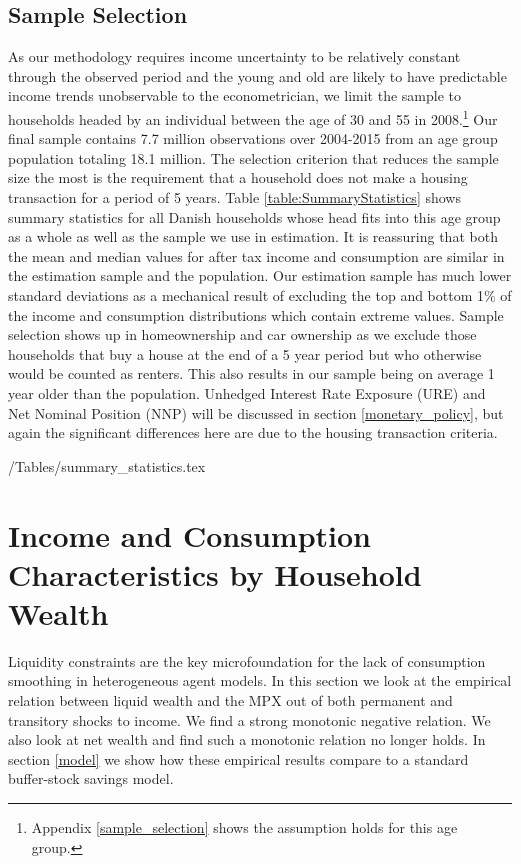 \documentclass[titlepage]{\econtex}\newcommand{\texname}{ConsumptionHeterogeneity}
\begin{document}
\subsection{Sample Selection}
As our methodology requires income uncertainty to be relatively constant through the observed period and the young and old are likely to have predictable income trends unobservable to the econometrician, we limit the sample to households headed by an individual between the age of 30 and 55 in 2008.\footnote{Appendix \ref{sample_selection} shows the assumption holds for this age group.} Our final sample contains 7.7 million observations over 2004-2015 from an age group population totaling 18.1 million. The selection criterion that reduces the sample size the most is the requirement that a household does not make a housing transaction for a period of 5 years. Table \ref{table:SummaryStatistics} shows summary statistics for all Danish households whose head fits into this age group as a whole as well as the sample we use in estimation. It is reassuring that both the mean and median values for after tax income and consumption are similar in the estimation sample and the population. Our estimation sample has much lower standard deviations as a mechanical result of excluding the top and bottom 1\% of the income and consumption distributions which contain extreme values. Sample selection shows up in homeownership and car ownership as we exclude those households that buy a house at the end of a 5 year period but who otherwise would be counted as renters. This also results in our sample being on average 1 year older than the population. Unhedged Interest Rate Exposure (URE) and Net Nominal Position (NNP) will be discussed in section \ref{monetary_policy}, but again the significant differences here are due to the housing transaction criteria. 
\begin{center} 
	\label{table:SummaryStatistics}
	\econtexRoot/Tables/summary_statistics.tex 
\end{center}

\section{Income and Consumption Characteristics by Household Wealth}
Liquidity constraints are the key microfoundation for the lack of consumption smoothing in heterogeneous agent models. In this section we look at the empirical relation between liquid wealth and the MPX out of both permanent and transitory shocks to income. We find a strong monotonic negative relation. We also look at net wealth and find such a monotonic relation no longer holds. In section \ref{model} we show how these empirical results compare to a standard buffer-stock savings model.
\end{document}
